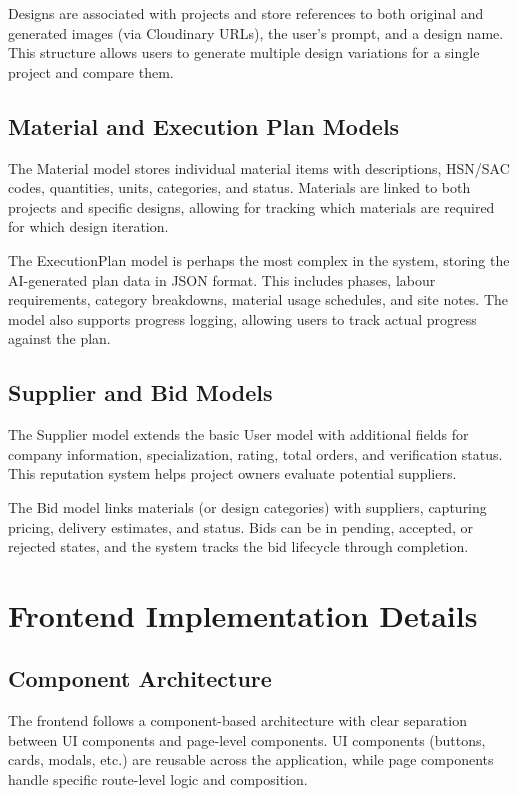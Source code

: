 \documentclass[conference]{IEEEtran}
\begin{document}
Designs are associated with projects and store references to both original and generated images (via Cloudinary URLs), the user's prompt, and a design name. This structure allows users to generate multiple design variations for a single project and compare them.

\subsection{Material and Execution Plan Models}
The Material model stores individual material items with descriptions, HSN/SAC codes, quantities, units, categories, and status. Materials are linked to both projects and specific designs, allowing for tracking which materials are required for which design iteration.

The ExecutionPlan model is perhaps the most complex in the system, storing the AI-generated plan data in JSON format. This includes phases, labour requirements, category breakdowns, material usage schedules, and site notes. The model also supports progress logging, allowing users to track actual progress against the plan.

\subsection{Supplier and Bid Models}
The Supplier model extends the basic User model with additional fields for company information, specialization, rating, total orders, and verification status. This reputation system helps project owners evaluate potential suppliers.

The Bid model links materials (or design categories) with suppliers, capturing pricing, delivery estimates, and status. Bids can be in pending, accepted, or rejected states, and the system tracks the bid lifecycle through completion.

\section{Frontend Implementation Details}

\subsection{Component Architecture}
The frontend follows a component-based architecture with clear separation between UI components and page-level components. UI components (buttons, cards, modals, etc.) are reusable across the application, while page components handle specific route-level logic and composition.
\end{document}
